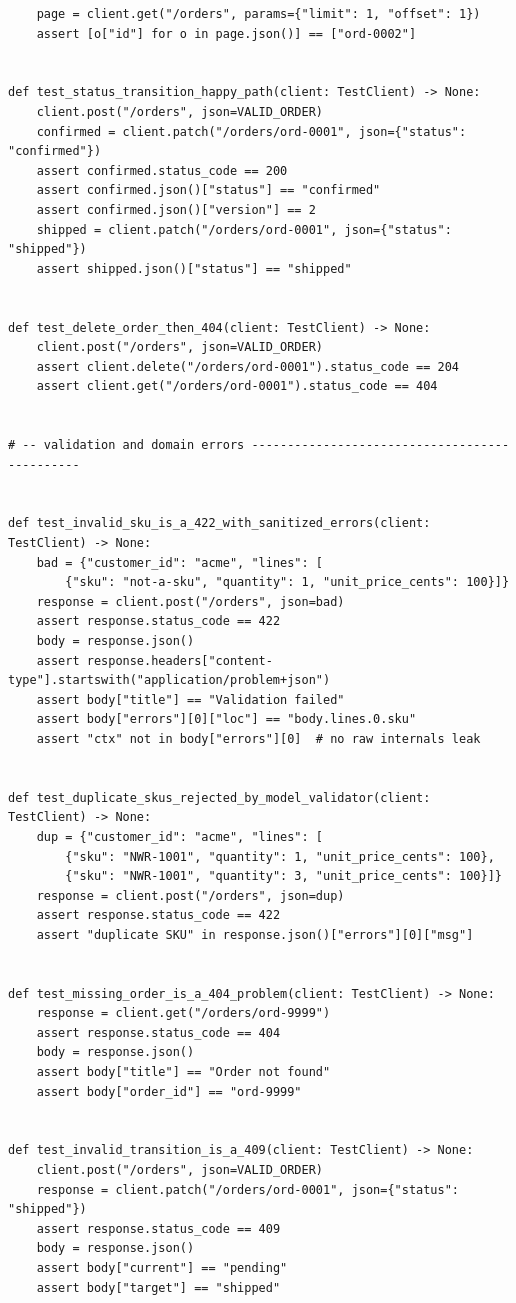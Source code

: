 \begin{verbatim}
    page = client.get("/orders", params={"limit": 1, "offset": 1})
    assert [o["id"] for o in page.json()] == ["ord-0002"]


def test_status_transition_happy_path(client: TestClient) -> None:
    client.post("/orders", json=VALID_ORDER)
    confirmed = client.patch("/orders/ord-0001", json={"status": "confirmed"})
    assert confirmed.status_code == 200
    assert confirmed.json()["status"] == "confirmed"
    assert confirmed.json()["version"] == 2
    shipped = client.patch("/orders/ord-0001", json={"status": "shipped"})
    assert shipped.json()["status"] == "shipped"


def test_delete_order_then_404(client: TestClient) -> None:
    client.post("/orders", json=VALID_ORDER)
    assert client.delete("/orders/ord-0001").status_code == 204
    assert client.get("/orders/ord-0001").status_code == 404


# -- validation and domain errors ----------------------------------------------


def test_invalid_sku_is_a_422_with_sanitized_errors(client: TestClient) -> None:
    bad = {"customer_id": "acme", "lines": [
        {"sku": "not-a-sku", "quantity": 1, "unit_price_cents": 100}]}
    response = client.post("/orders", json=bad)
    assert response.status_code == 422
    body = response.json()
    assert response.headers["content-type"].startswith("application/problem+json")
    assert body["title"] == "Validation failed"
    assert body["errors"][0]["loc"] == "body.lines.0.sku"
    assert "ctx" not in body["errors"][0]  # no raw internals leak


def test_duplicate_skus_rejected_by_model_validator(client: TestClient) -> None:
    dup = {"customer_id": "acme", "lines": [
        {"sku": "NWR-1001", "quantity": 1, "unit_price_cents": 100},
        {"sku": "NWR-1001", "quantity": 3, "unit_price_cents": 100}]}
    response = client.post("/orders", json=dup)
    assert response.status_code == 422
    assert "duplicate SKU" in response.json()["errors"][0]["msg"]


def test_missing_order_is_a_404_problem(client: TestClient) -> None:
    response = client.get("/orders/ord-9999")
    assert response.status_code == 404
    body = response.json()
    assert body["title"] == "Order not found"
    assert body["order_id"] == "ord-9999"


def test_invalid_transition_is_a_409(client: TestClient) -> None:
    client.post("/orders", json=VALID_ORDER)
    response = client.patch("/orders/ord-0001", json={"status": "shipped"})
    assert response.status_code == 409
    body = response.json()
    assert body["current"] == "pending"
    assert body["target"] == "shipped"



\end{verbatim}

